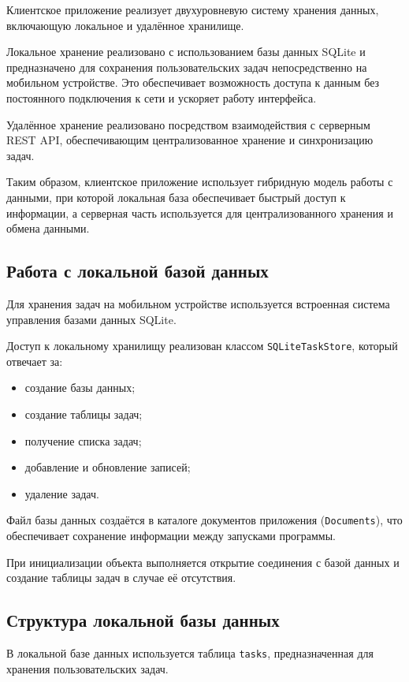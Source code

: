\documentclass[14pt,a4paper]{extarticle}
\begin{document}
Клиентское приложение реализует двухуровневую систему хранения данных, включающую локальное и удалённое хранилище.

Локальное хранение реализовано с использованием базы данных SQLite и предназначено для сохранения пользовательских задач непосредственно на мобильном устройстве. Это обеспечивает возможность доступа к данным без постоянного подключения к сети и ускоряет работу интерфейса.

Удалённое хранение реализовано посредством взаимодействия с серверным REST API, обеспечивающим централизованное хранение и синхронизацию задач.

Таким образом, клиентское приложение использует гибридную модель работы с данными, при которой локальная база обеспечивает быстрый доступ к информации, а серверная часть используется для централизованного хранения и обмена данными.

\subsection{Работа с локальной базой данных}

Для хранения задач на мобильном устройстве используется встроенная система управления базами данных SQLite.

Доступ к локальному хранилищу реализован классом \texttt{SQLiteTaskStore}, который отвечает за:

\begin{itemize}
    \item создание базы данных;
    \item создание таблицы задач;
    \item получение списка задач;
    \item добавление и обновление записей;
    \item удаление задач.
\end{itemize}

Файл базы данных создаётся в каталоге документов приложения (\texttt{Documents}), что обеспечивает сохранение информации между запусками программы.

При инициализации объекта выполняется открытие соединения с базой данных и создание таблицы задач в случае её отсутствия.

\subsection{Структура локальной базы данных}

В локальной базе данных используется таблица \texttt{tasks}, предназначенная для хранения пользовательских задач.
\end{document}
